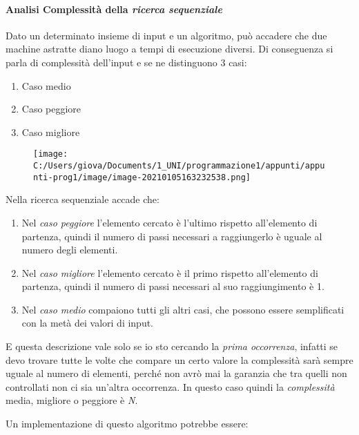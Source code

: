 \documentclass[
]{article}
\begin{document}
\hypertarget{header-n1516}{%
\paragraph{\texorpdfstring{Analisi Complessità della \emph{ricerca
sequenziale}}{Analisi Complessità della ricerca sequenziale}}\label{header-n1516}}

Dato un determinato insieme di input e un algoritmo, può accadere che
due machine astratte diano luogo a tempi di esecuzione diversi. Di
conseguenza si parla di complessità dell'input e se ne distinguono 3
casi:

\begin{enumerate}
\def\labelenumi{\arabic{enumi}.}
\item
  Caso medio
\item
  Caso peggiore
\item
  Caso migliore
\end{enumerate}

\begin{figure}
\centering
\texttt{[image: C:/Users/giova/Documents/1\_UNI/programmazione1/appunti/appunti-prog1/image/image-20210105163232538.png]}
\caption{}
\end{figure}

Nella ricerca sequenziale accade che:

\begin{enumerate}
\def\labelenumi{\arabic{enumi}.}
\item
  Nel \emph{caso peggiore} l'elemento cercato è l'ultimo rispetto
  all'elemento di partenza, quindi il numero di passi necessari a
  raggiungerlo è uguale al numero degli elementi.
\item
  Nel \emph{caso migliore} l'elemento cercato è il primo rispetto
  all'elemento di partenza, quindi il numero di passi necessari al suo
  raggiungimento è 1.
\item
  Nel \emph{caso medio} compaiono tutti gli altri casi, che possono
  essere semplificati con la metà dei valori di input.
\end{enumerate}

E questa descrizione vale solo se io sto cercando la \emph{prima
occorrenza}, infatti se devo trovare tutte le volte che compare un certo
valore la complessità sarà sempre uguale al numero di elementi, perché
non avrò mai la garanzia che tra quelli non controllati non ci sia
un'altra occorrenza. In questo caso quindi la \emph{complessità} media,
migliore o peggiore è \emph{N}.

Un implementazione di questo algoritmo potrebbe essere:
\end{document}
